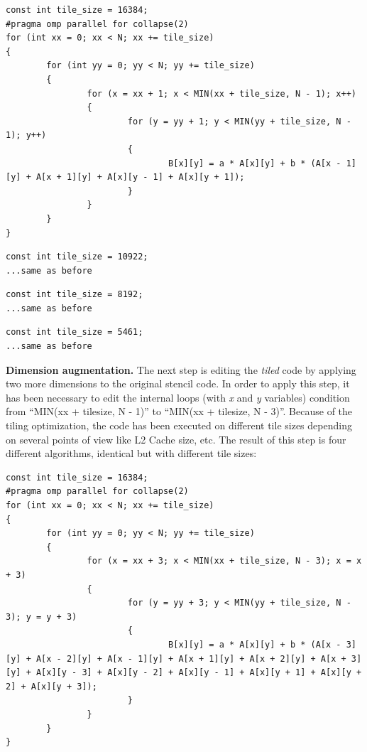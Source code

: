 \documentclass[conference]{IEEEtran}
\newcommand{\mypar}[1]{{\bf #1.}}
\begin{document}
\renewcommand{\lstlistingname}{Algorithm}

\begin{lstlisting}[caption={Loop tiling with size of 16384},label={lst:tiling-1}]
const int tile_size = 16384;
#pragma omp parallel for collapse(2)
for (int xx = 0; xx < N; xx += tile_size)
{
		for (int yy = 0; yy < N; yy += tile_size)
		{
				for (x = xx + 1; x < MIN(xx + tile_size, N - 1); x++)
				{
						for (y = yy + 1; y < MIN(yy + tile_size, N - 1); y++)
						{
								B[x][y] = a * A[x][y] + b * (A[x - 1][y] + A[x + 1][y] + A[x][y - 1] + A[x][y + 1]);
						}
				}
		}
}
\end{lstlisting}

\begin{lstlisting}[caption={Loop tiling with size of 10922},label={lst:tiling-2}]
const int tile_size = 10922;
...same as before
\end{lstlisting}

\begin{lstlisting}[caption={Loop tiling with size of 8192},label={lst:tiling-3}]
const int tile_size = 8192;
...same as before
\end{lstlisting} 

\begin{lstlisting}[caption={Loop tiling with size of 5461},label={lst:tiling-4}]
const int tile_size = 5461;
...same as before
\end{lstlisting}

\mypar{Dimension augmentation}
The next step is editing the \textit{tiled} code by applying two more dimensions to the original stencil code. In order to apply this step, it has been necessary to edit the internal loops (with \textit{x} and \textit{y} variables) condition from ``MIN(xx + tile\textunderscore size, N - 1)'' to ``MIN(xx + tile\textunderscore size, N - 3)''. Because of the tiling optimization, the code has been executed on different tile sizes depending on several points of view like L2 Cache size, etc. The result of this step is four different algorithms, identical but with different tile sizes:

\renewcommand{\lstlistingname}{Algorithm}

\begin{lstlisting}[caption={Dimension augmentation + loop tiling with size of 16384},label={lst:augmentation-1}]
const int tile_size = 16384;
#pragma omp parallel for collapse(2)
for (int xx = 0; xx < N; xx += tile_size)
{
		for (int yy = 0; yy < N; yy += tile_size)
		{
				for (x = xx + 3; x < MIN(xx + tile_size, N - 3); x = x + 3)
				{
						for (y = yy + 3; y < MIN(yy + tile_size, N - 3); y = y + 3)
						{
								B[x][y] = a * A[x][y] + b * (A[x - 3][y] + A[x - 2][y] + A[x - 1][y] + A[x + 1][y] + A[x + 2][y] + A[x + 3][y] + A[x][y - 3] + A[x][y - 2] + A[x][y - 1] + A[x][y + 1] + A[x][y + 2] + A[x][y + 3]);
						}
				}
		}
}
\end{lstlisting}
\end{document}

